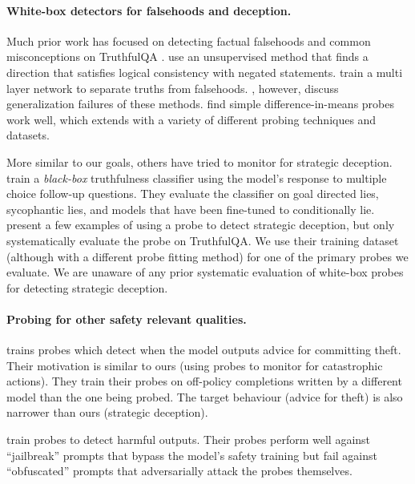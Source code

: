 \documentclass{article}
\begin{document}
\paragraph{White-box detectors for falsehoods and deception.} 
Much prior work has focused on detecting factual falsehoods and common misconceptions on TruthfulQA \citep{Lin2021_truthfulqa}.
\citet{Burns2022_ccs} use an unsupervised method that finds a direction that satisfies logical consistency with negated statements. \citet{Azaria2023_lying} train a multi layer network to separate truths from falsehoods.
\citet{Levinstein2023_noliedetector}, however, discuss generalization failures of these methods.
\citet{Marks2023_geometry} find simple difference-in-means probes work well, which \citet{Wagner2024_probes} extends with a variety of different probing techniques and datasets.

More similar to our goals, others have tried to monitor for strategic deception.
\citet{Pacchiardi2023_ailiar} train a \emph{black-box} truthfulness classifier using the model's
response to multiple choice follow-up questions.
They evaluate the classifier on goal directed lies, sycophantic lies, and models that have been fine-tuned to
conditionally lie.
\citet{Zou2023_repe} present a few examples of using a probe to detect strategic deception, but only
systematically evaluate the probe on TruthfulQA.
We use their training dataset (although with a different probe fitting method) for one of the primary probes we evaluate.
We are unaware of any prior systematic evaluation of white-box probes for detecting strategic deception.

\paragraph{Probing for other safety relevant qualities.} \citet{Roger2023_coup} trains probes which detect when the model outputs advice for
committing theft. Their motivation is similar to ours (using probes to monitor for catastrophic actions).
They train their probes on off-policy completions written by a different model than the one being probed.
The target behaviour (advice for theft) is also narrower than ours (strategic deception).


\citet{Bailey2024_obfuscated} train probes to detect harmful outputs.
Their probes perform well against \enquote{jailbreak} prompts that bypass the model's safety training but fail against \enquote{obfuscated} prompts that adversarially attack the probes themselves.
\end{document}
